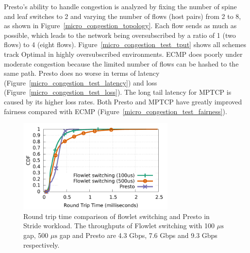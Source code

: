 Presto's ability to handle congestion is analyzed by fixing 
the number of spine and leaf switches to 2 and varying
the number of flows (host pairs) from 2 to 8, as shown
in Figure~\ref{micro_congestion_topology}. 
Each flow sends as much as possible, which leads to the network
being oversubscribed by a ratio of 1 (two flows) to 4 (eight flows).
Figure~\ref{micro_congestion_test_tput} shows all schemes track Optimal in highly
oversubscribed environments. ECMP
does poorly under moderate congestion because the limited number of flows can be hashed to the same path.
Presto does no worse in terms of latency (Figure~\ref{micro_congestion_test_latency}) and loss (Figure~\ref{micro_congestion_test_loss}).
The long tail latency for MPTCP is caused by its higher loss rates.
Both Presto and MPTCP have greatly improved fairness compared with ECMP (Figure~\ref{micro_congestion_test_fairness}).

\begin{figure}[!t]
        \centering
  \includegraphics[width=0.7\textwidth]{presto/figures/flowlets/flowlet_switching/flowlet_presto_compare_sockperf.pdf}
        \caption{Round trip time comparison of flowlet switching and Presto in Stride workload. 
		The throughputs of Flowlet switching with 100 $\mu\text{s}$ gap, 500 $\mu\text{s}$ gap and Presto 
		are 4.3 Gbps, 7.6 Gbps and 9.3 Gbps respectively. }
        \label{micro_flowlet_rtt_compare}
\end{figure}


